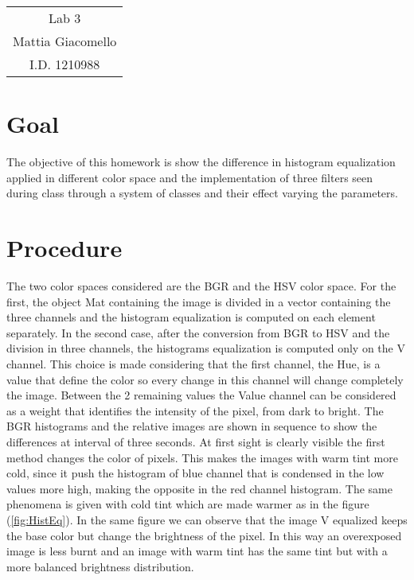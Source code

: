 \documentclass[11pt,a4paper]{article}
\newcommand{\cc}{\fontfamily{txtt}\selectfont}
\begin{document}
\begin{center}
\begin{tabular}{c}
\LARGE{Lab 3}\\
\large{Mattia Giacomello}\\
I.D. 1210988
\end{tabular}
\end{center}

\section{Goal}
The objective of this homework is show the difference in histogram equalization applied in different color space and the implementation of three filters seen during class through a system of classes and their effect varying the parameters.

\section{Procedure}
The two color spaces considered are the BGR and the HSV color space. \newline 
For the first, the object {\cc Mat} containing the image is divided in a {\cc vector} containing the three channels and the histogram equalization is computed on each element separately.
In the second case, after the conversion from BGR to HSV and the division in three channels, the histograms equalization is computed only on the V channel.
This choice is made considering that the first channel, the Hue, is a value that define the color so every change in this channel will change completely the image.
Between the 2 remaining values the Value channel can be considered as a weight that identifies the intensity of the pixel, from dark to bright. \newline
The BGR histograms and the relative images are shown in sequence to show the differences at interval of three seconds.\newline
At first sight is clearly visible the first method changes the color of pixels.
This makes the images with warm tint more cold, since it push the histogram of blue channel that is condensed in the low values more high, making the opposite in the red channel histogram.
The same phenomena is given with cold tint which are made warmer as in the figure (\ref{fig:HistEq}).
In the same figure we can observe that the image V equalized keeps the base color but change the brightness of the pixel.
In this way an overexposed image is less burnt and an image with warm tint has the same tint but with a more balanced brightness distribution.
\end{document}
